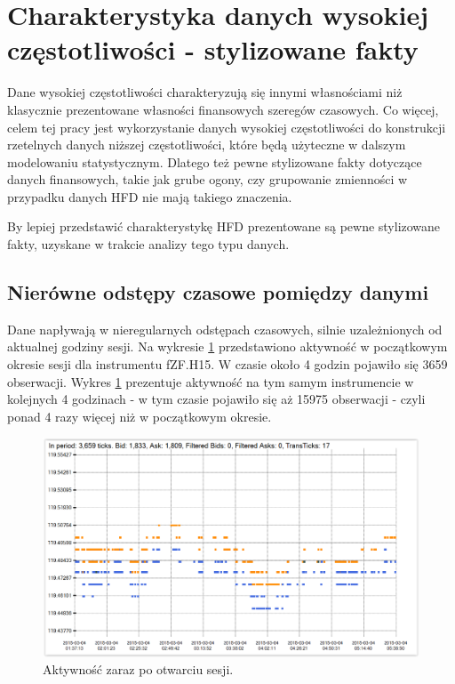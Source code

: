 \documentclass[a4paper,12pt,openany, DIV=calc, headsepline]{scrbook}
\begin{document}
\section{Charakterystyka danych wysokiej częstotliwości - stylizowane fakty}

Dane wysokiej częstotliwości charakteryzują się innymi własnościami niż klasycznie prezentowane własności finansowych szeregów czasowych. Co więcej, celem tej pracy jest wykorzystanie danych wysokiej częstotliwości do konstrukcji rzetelnych danych niższej częstotliwości, które będą użyteczne w dalszym modelowaniu statystycznym. Dlatego też pewne stylizowane fakty dotyczące danych finansowych, takie jak grube ogony, czy grupowanie zmienności w przypadku danych HFD nie mają takiego znaczenia.

By lepiej przedstawić charakterystykę HFD prezentowane są pewne stylizowane fakty, uzyskane w trakcie analizy tego typu danych.

\subsection{Nierówne odstępy czasowe pomiędzy danymi}

Dane napływają w nieregularnych odstępach czasowych, silnie uzależnionych od aktualnej godziny sesji. Na wykresie \ref{fig:volB} przedstawiono aktywność w początkowym okresie sesji dla instrumentu fZF.H15. W czasie około 4 godzin pojawiło się 3659 obserwacji. Wykres \ref{fig:volB} prezentuje aktywność na tym samym instrumencie w kolejnych 4 godzinach - w tym czasie pojawiło się aż 15975 obserwacji - czyli ponad 4 razy więcej niż w początkowym okresie.

\begin{figure}[H]
  \centering
  \includegraphics[scale=0.5]{wykresy/vol2.PNG}
  \caption{Aktywność zaraz po otwarciu sesji.}
  \label{fig:volB}
\end{figure}
\end{document}
